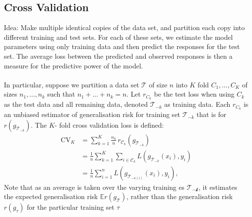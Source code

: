 \documentclass[12pt]{article}
\begin{document}
\subsection{Cross Validation}
Idea: Make multiple identical copies of the data set, and partition each copy into different training and test sets. For each of these sets, we estimate the model parameters using only training data and then predict the responses for the test set. The average loss between the predicted and observed responses is then a measure for the predictive power of the model. \\
\\
In particular, suppose we partition a data set $\mathcal{T}$ of size $n$ into $K$ fold $C_1, \dots, C_K$ of sizes $n_1, \dots,n_k$ such that $n_1 + \dots + n_k = n$. Let $r_{C_k}$ be the test loss when using $C_k$ as the test data and all remaining data, denoted $\mathcal{T}_{-k}$ as training data. Each $r_{C_k}$ is an unbiased estimator of generalisation risk for training set $\mathcal{T}_{-k}$ that is for $r(g_{\mathcal{T}_{-k}}).$ The $K$- fold cross validation loss is defined:
\begin{align*}
\text{CV}_K &= \sum_{k=1}^K \frac{n_k}{n} \, r_{\mathcal{C}_k}(g_{\mathcal{T}_{-k}}) \\
&= \frac{1}{n} \sum_{k=1}^K \sum_{i \in \mathcal{C}_k} L(g_{\mathcal{T}_{-k}}(x_i), y_i) \\
&= \frac{1}{n} \sum_{i=1}^n L(g_{\mathcal{T}_{-\kappa(i)}}(x_i), y_i),
\end{align*}
Note that as an average is taken over the varying training es {$\mathcal{T_{-k}}$}, it estimates the expected generalisation risk $\mathbb{E}r(g_\mathcal{T})$, rather than the generalisation risk $r(g_\tau)$ for the particular training set $\tau$
\end{document}
